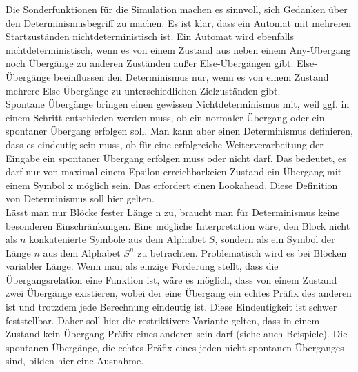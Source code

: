 \label{Determinismus}
Die Sonderfunktionen für die Simulation machen es sinnvoll, sich Gedanken über den Determinismusbegriff zu machen. Es ist klar, dass ein Automat mit mehreren Startzuständen nichtdeterministisch ist. Ein Automat wird ebenfalls nichtdeterministisch, wenn es von einem Zustand aus neben einem Any-Übergang noch Übergänge zu anderen Zuständen außer Else-Übergängen gibt. Else-Übergänge beeinflussen den Determinismus nur, wenn es von einem Zustand mehrere Else-Übergänge zu unterschiedlichen Zielzuständen gibt.\\
Spontane Übergänge bringen einen gewissen Nichtdeterminismus mit, weil ggf. in einem Schritt entschieden werden muss, ob ein normaler Übergang oder ein spontaner Übergang erfolgen soll. Man kann aber einen Determinismus definieren, dass es eindeutig sein muss, ob für eine erfolgreiche Weiterverarbeitung der Eingabe ein spontaner Übergang erfolgen muss oder nicht darf. Das bedeutet, es darf nur von maximal einem Epsilon-erreichbarkeien Zustand ein Übergang mit einem Symbol x möglich sein. Das erfordert einen Lookahead. Diese Definition von Determinismus soll hier gelten.\\
Lässt man nur Blöcke fester Länge n zu, braucht man für Determinismus keine besonderen Einschränkungen. Eine mögliche Interpretation wäre, den Block nicht als $n$ konkatenierte Symbole aus dem Alphabet $S$, sondern als ein Symbol der Länge $n$ aus dem Alphabet $S^n$ zu betrachten. Problematisch wird es bei Blöcken variabler Länge. Wenn man als einzige Forderung stellt, dass die Übergangsrelation eine Funktion ist, wäre es möglich, dass von einem Zustand zwei Übergänge existieren, wobei der eine Übergang ein echtes Präfix des anderen ist und trotzdem jede Berechnung eindeutig ist. Diese Eindeutigkeit ist schwer feststellbar. Daher soll hier die restriktivere Variante gelten, dass in einem Zustand kein Übergang Präfix eines anderen sein darf (siehe auch Beispiele). Die spontanen Übergänge, die echtes Präfix eines jeden nicht spontanen Überganges sind, bilden hier eine Ausnahme.
